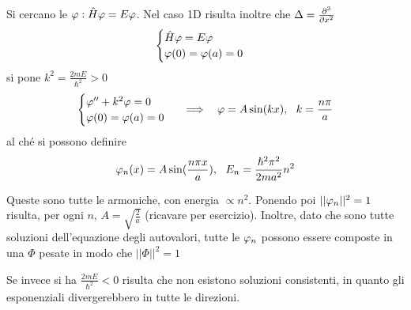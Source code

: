 Si cercano le $\varphi : \hat{H}\varphi = E\varphi$. Nel caso 1D risulta inoltre che $\Delta = \frac{\partial^2 }{\partial x^2}$
\[
    \begin{cases}
        \hat{H}\varphi = E \varphi \\ 
        \varphi(0) = \varphi(a) = 0
    \end{cases}
\]
si pone $k^2 = \frac{2mE}{\hslash^2}>0$
\[
    \begin{cases}
        \varphi'' + k^2\varphi = 0\\
        \varphi(0) = \varphi(a) = 0
    \end{cases}
    \ \implies\ \ \varphi = A\sin(kx),\ \ k = \frac{n\pi}{a}
\]
al ché si possono definire
\[
    \varphi_n(x) = A\sin(\frac{n\pi x}{a}),\ \ E_n = \frac{\hslash^2 \pi^2}{2 m a^2} n^2
\]

Queste sono tutte le armoniche, con energia $\propto n^2$. Ponendo poi $||\varphi_n||^2 = 1$ risulta, per ogni $n$, $A = \sqrt{\frac{2}{a}}$ (ricavare per esercizio). Inoltre, dato che sono tutte soluzioni dell'equazione degli autovalori, tutte le $\varphi_n$ possono essere composte in una $\Phi$ pesate in modo che $||\Phi||^2 = 1$

Se invece si ha $\frac{2mE}{\hslash^2}<0$ risulta che non esistono soluzioni consistenti, in quanto gli esponenziali divergerebbero in tutte le direzioni.

\begin{figure}[h]
\centering
{}
\end{figure}

